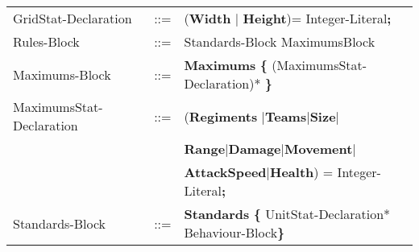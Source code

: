 \begin{center}
\begin{longtable}{ l l l }
		GridStat-Declaration		&	::=	&({\bf Width} $\mid$ {\bf Height})=  Integer-Literal{\bf ;} \\	
		Rules-Block					&	::=	&Standards-Block MaximumsBlock 				\\
		Maximums-Block				&	::=	&{\bf Maximums} {\bf \{} (MaximumsStat-Declaration)* {\bf \}}\\
		MaximumsStat-Declaration	&	::=	&({\bf Regiments }$\mid${\bf Teams}$\mid${\bf Size}$\mid$\\
									&		&{\bf Range}$\mid${\bf Damage}$\mid${\bf Movement}$\mid$\\
									&		&{\bf AttackSpeed}$\mid${\bf Health}) =  Integer-Literal{\bf ;}\\
		Standards-Block				&	::=	&{\bf Standards} {\bf \{ } UnitStat-Declaration* Behaviour-Block\bf{\} }		\\
	\end{longtable}
		\end{center}					     